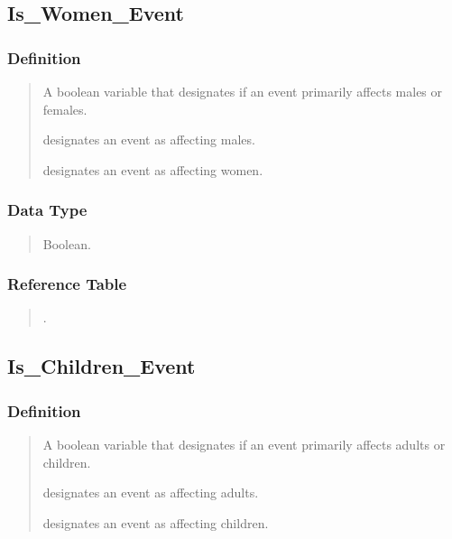 \documentclass[letterpaper,10pt,english]{sphinxmanual}
\begin{document}
\subsection{Is\_Women\_Event}
\label{\detokenize{schema_tables:is-women-event}}

\subsubsection{Definition}
\label{\detokenize{schema_tables:id79}}\begin{quote}

\sphinxAtStartPar
A boolean variable that designates if an event primarily affects males or females.

 designates an event as affecting males.

 designates an event as affecting women.
\end{quote}


\subsubsection{Data Type}
\label{\detokenize{schema_tables:id80}}\begin{quote}

\sphinxAtStartPar
Boolean.
\end{quote}


\subsubsection{Reference Table}
\label{\detokenize{schema_tables:id81}}\begin{quote}

\sphinxAtStartPar
{\hyperref[\detokenize{schema_tables:overview-table}]{}}.
\end{quote}


\subsection{Is\_Children\_Event}
\label{\detokenize{schema_tables:is-children-event}}

\subsubsection{Definition}
\label{\detokenize{schema_tables:id82}}\begin{quote}

\sphinxAtStartPar
A boolean variable that designates if an event primarily affects adults or children.

 designates an event as affecting adults.

 designates an event as affecting children.
\end{quote}
\end{document}
